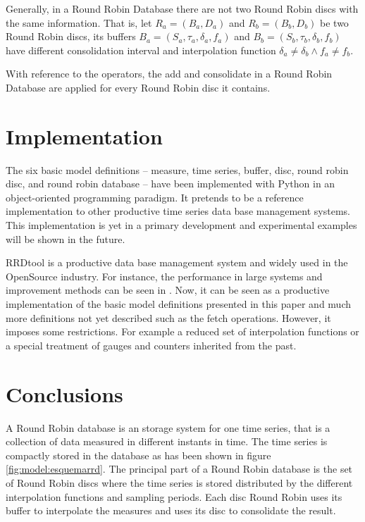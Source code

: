 Generally, in a Round Robin Database there are not two Round Robin discs
with the same information. That is, let $R_a = (B_a, D_a)$ and $R_b =
(B_b, D_b)$ be two Round Robin discs, its buffers
$B_a=(S_a,\tau_a,\delta_a,f_a)$ and $B_b=(S_b,\tau_b,\delta_b,f_b)$
have different consolidation interval and interpolation function
$\delta_a \neq \delta_b \wedge f_a \neq f_b$.


With reference to the operators, the add and consolidate in a Round
Robin Database are applied for every Round Robin disc it contains.


\section{Implementation}

The six basic model definitions -- measure, time series, buffer, disc,
round robin disc, and round robin database -- have been implemented
with Python in an object-oriented programming paradigm. It pretends to
be a reference implementation to other productive time series data
base management systems. This implementation is yet in a primary
development and experimental examples will be shown in the future.

RRDtool \parencite{rrdtool} is a productive data base
management system and widely used in the OpenSource industry. For
instance, the performance in large systems and improvement methods can
be seen in \cite{lisa07:plonka}. Now, it can be seen as a
productive implementation of the basic model definitions presented in
this paper and much more definitions not yet described such as the
fetch operations. However, it imposes some restrictions. For example a
reduced set of interpolation functions or a special treatment of
gauges and counters inherited from the past.

\section{Conclusions}

A Round Robin database is an storage system for one time series, that
is a collection of data measured in different instants in time.  The
time series is compactly stored in the database as has been shown in
figure \ref{fig:model:esquemarrd}. The principal part of a Round Robin
database is the set of Round Robin discs where the time series is
stored distributed by the different interpolation functions and
sampling periods. Each disc Round Robin uses its buffer to interpolate
the measures and uses its disc to consolidate the result. 

